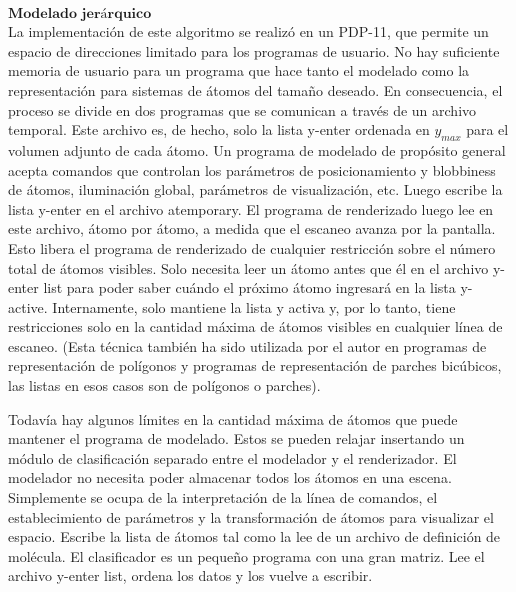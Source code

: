 ${ }$\\
$\textbf{Modelado jerárquico}$
${ }$\\

La implementación de este algoritmo se realizó en un PDP-11, que permite un espacio de direcciones limitado para los programas de usuario. No hay suficiente memoria de usuario para un programa que hace tanto el modelado como la representación para sistemas de átomos del tamaño deseado. En consecuencia, el proceso se divide en dos programas que se comunican a través de un archivo temporal. Este archivo es, de hecho, solo la lista y-enter ordenada en $y_{max}$ para el volumen adjunto de cada átomo. Un programa de modelado de propósito general acepta comandos que controlan los parámetros de posicionamiento y blobbiness de átomos, iluminación global, parámetros de visualización, etc. Luego escribe la lista y-enter en el archivo atemporary. El programa de renderizado luego lee en este archivo, átomo por átomo, a medida que el escaneo avanza por la pantalla. Esto libera el programa de renderizado de cualquier restricción sobre el número total de átomos visibles. Solo necesita leer un átomo antes que él en el archivo y-enter list para poder saber cuándo el próximo átomo ingresará en la lista y-active. Internamente, solo mantiene la lista y activa y, por lo tanto, tiene restricciones solo en la cantidad máxima de átomos visibles en cualquier línea de escaneo. (Esta técnica también ha sido utilizada por el autor en programas de representación de polígonos y programas de representación de parches bicúbicos, las listas en esos casos son de polígonos o parches).

Todavía hay algunos límites en la cantidad máxima de átomos que puede mantener el programa de modelado. Estos se pueden relajar insertando un módulo de clasificación separado entre el modelador y el renderizador. El modelador no necesita poder almacenar todos los átomos en una escena. Simplemente se ocupa de la interpretación de la línea de comandos, el establecimiento de parámetros y la transformación de átomos para visualizar el espacio. Escribe la lista de átomos tal como la lee de un archivo de definición de molécula. El clasificador es un pequeño programa con una gran matriz. Lee el archivo y-enter list, ordena los datos y los vuelve a escribir.

